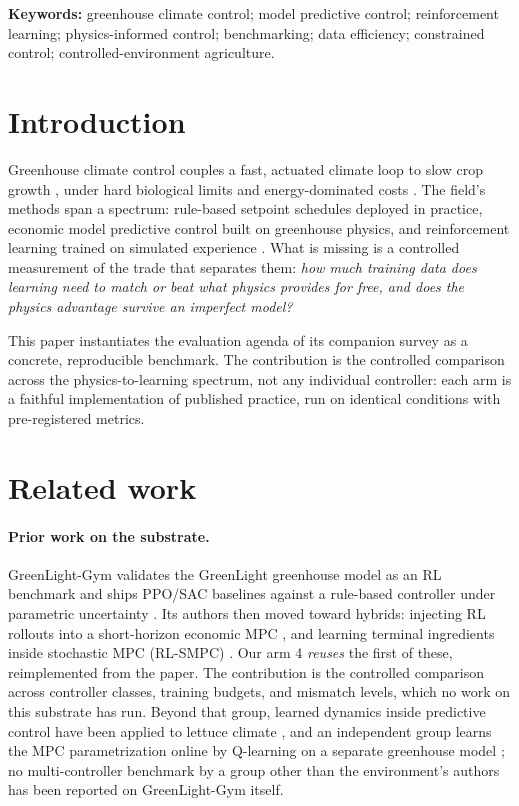 \documentclass[11pt]{article}
\begin{document}
\vspace{0.4em}
\noindent\textbf{Keywords:} greenhouse climate control; model predictive control; reinforcement learning; physics-informed control; benchmarking; data efficiency; constrained control; controlled-environment agriculture.

\section{Introduction}\label{sec:intro}

Greenhouse climate control couples a fast, actuated climate loop to slow crop growth \citep{vanhenten2009timescale, vanstraten2010survey}, under hard biological limits and energy-dominated costs \citep{stanghellini1987transpiration, vanbeveren2015optimal}. The field's methods span a spectrum: rule-based setpoint schedules deployed in practice, economic model predictive control built on greenhouse physics, and reinforcement learning trained on simulated experience \citep{vanlaatum2024greenlight, vanlaatum2026rlmpc}. What is missing is a controlled measurement of the trade that separates them: \emph{how much training data does learning need to match or beat what physics provides for free, and does the physics advantage survive an imperfect model?}

This paper instantiates the evaluation agenda of its companion survey as a concrete, reproducible benchmark. The contribution is the controlled comparison across the physics-to-learning spectrum, not any individual controller: each arm is a faithful implementation of published practice, run on identical conditions with pre-registered metrics.

\section{Related work}\label{sec:related}

\paragraph{Prior work on the substrate.} GreenLight-Gym validates the GreenLight greenhouse model as an RL benchmark and ships PPO/SAC baselines against a rule-based controller under parametric uncertainty \citep{vanlaatum2024greenlight}. Its authors then moved toward hybrids: injecting RL rollouts into a short-horizon economic MPC \citep{vanlaatum2026rlmpc}, and learning terminal ingredients inside stochastic MPC (RL-SMPC) \citep{vanlaatum2026rlsmpc}. Our arm 4 \emph{reuses} the first of these, reimplemented from the paper. The contribution is the controlled comparison across controller classes, training budgets, and mismatch levels, which no work on this substrate has run. Beyond that group, learned dynamics inside predictive control have been applied to lettuce climate \citep{soumo2025bilstm}, and an independent group learns the MPC parametrization online by Q-learning on a separate greenhouse model \citep{mallick2025rlmpc}; no multi-controller benchmark by a group other than the environment's authors has been reported on GreenLight-Gym itself.
\end{document}
